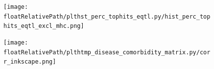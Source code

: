 %
%

\begin{figure}[h!]
    \centering
    \texttt{[image: \\floatRelativePath/plthst\_perc\_tophits\_eqtl.py/hist\_perc\_tophits\_eqtl\_excl\_mhc.png]}
    \caption{}
\end{figure}

%
%

\begin{figure}[h!]
    \centering
    \texttt{[image: \\floatRelativePath/plthtmp\_disease\_comorbidity\_matrix.py/corr\_inkscape.png]}
    \caption{}
\end{figure}

%
%


%
%

